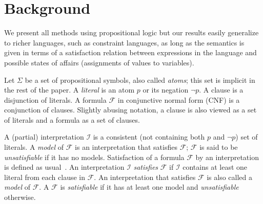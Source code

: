 \documentclass[a4paper,UKenglish,cleveref, autoref, thm-restate, pdfa]{lipics-v2021}
\newcommand\m[1]{\mathcal{#1}}
\renewcommand\comment[1]{}
\newcommand{\emilio}[1]{{\comment{\color{red}Emilio: #1}}}
\newcommand{\bart}[1]{{\comment{\color{OliveGreen}Bart: #1}}}
\newcommand\formula{\ensuremath{\m{F} }\xspace}
\newcommand\voc{\ensuremath{\Sigma}\xspace}
\begin{document}

\section{Background}\label{sec:background}

We present all methods using propositional logic but our results easily generalize to richer languages, such as constraint languages, as long as the semantics is given in terms of a satisfaction relation between expressions in the language and possible states of affairs (assignments of values to variables).

Let \voc be a set of propositional symbols, also called \emph{atoms}; this set is implicit in the rest of the paper. A \emph{literal} is an atom $p$ or its negation $\lnot p$. 
A clause is a disjunction of literals. A formula $\formula$ in conjunctive normal form (CNF) is a conjunction of clauses. 
Slightly abusing notation, a clause is also viewed as a set of literals and a formula as a set of clauses. 

A (partial) interpretation $\m{I}$ is a consistent (not containing both $p$ and $\lnot p$) set of literals. 
A \emph{model} of \formula is an interpretation that satisfies \formula; $\formula$ is said to be \emph{unsatisfiable} if it has no models.
Satisfaction of a formula \formula by an interpretation is defined as usual~\cite{faia/2009-185}.
	An interpretation $\m{I}$ \emph{satisfies} \formula if $\m{I}$ contains at least one literal from each clause in $\formula$.
	An interpretation that satisfies $\formula$ is also called a \emph{model} of \formula. 
	A \formula is \emph{satisfiable} if it has at least one model and \emph{unsatisfiable} otherwise. 
	
\end{document}
